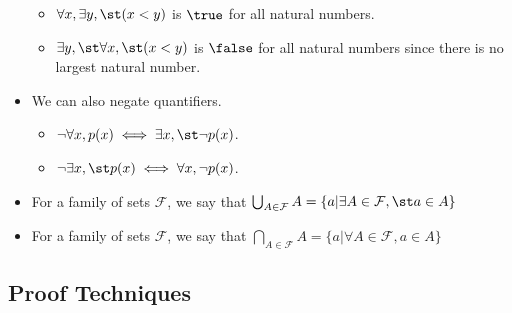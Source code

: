\begin{itemize}
  \begin{itemize}
  \tightlist
  \item
    \(\forall x, \exists y, \st (x < y)\) is \(\true\) for all natural
    numbers.
  \item
    \(\exists y, \st \forall x, \st (x < y)\) is \(\false\) for all
    natural numbers since there is no largest natural number.
  \end{itemize}
\item
  We can also negate quantifiers.

  \begin{itemize}
  \tightlist
  \item
    \(\lnot \forall x, p(x) \iff \exists x, \st \lnot p(x)\).
  \item
    \(\lnot \exists x, \st p(x) \iff \forall x, \lnot p(x)\).
  \end{itemize}
\item
  For a family of sets \(\mathcal{F}\), we say that
  \(\bigcup_{A \in \mathcal{F}} A = \{a | \exists A \in \mathcal{F}, \st a \in A\}\)
\item
  For a family of sets \(\mathcal{F}\), we say that
  \(\bigcap_{A \in \mathcal{F}} A = \{a | \forall A \in \mathcal{F}, a \in A\}\)
\end{itemize}

\hypertarget{proof-techniques}{%
\subsection{Proof Techniques}\label{proof-techniques}}

